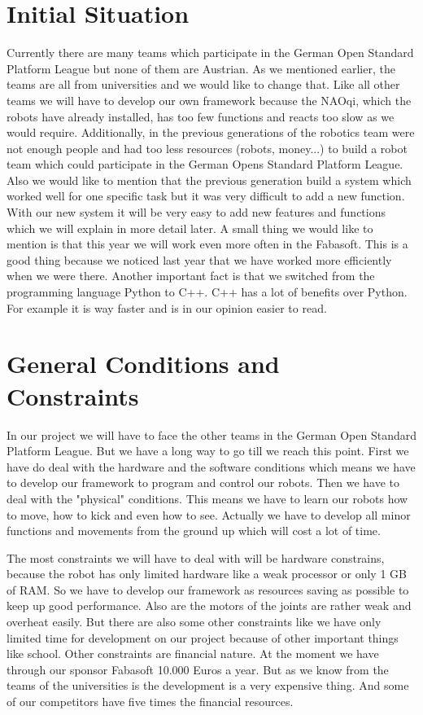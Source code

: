 \documentclass[12pt]{article}
\theoremstyle{definition}
\begin{document}
\pagebreak

\section{Initial Situation}


Currently there are many teams which participate in the German Open Standard Platform League but none of them are Austrian. As we mentioned earlier, the teams are all from universities and we would like to change that. Like all other teams we will have to develop our own framework because the NAOqi, which the robots have already installed, has too few functions and reacts too slow as we would require. Additionally, in the previous generations of the robotics team were not enough people and had too less resources (robots, money...) to build a robot team which could participate in the German Opens Standard Platform League. Also we would like to mention that the previous generation build a system which worked well for one specific task but it was very difficult to add a new function. With our new system it will be very easy to add new features and functions which we will explain in more detail later. A small thing we would like to mention is that this year we will work even more often in the Fabasoft. This is a good thing because we noticed last year that we have worked more efficiently when we were there. Another important fact is that we switched from the programming language Python to C++. C++ has a lot of benefits over Python. For example it is way faster and is in our opinion easier to read. 


\pagebreak

\section{General Conditions and Constraints}

In our project we will have to face the other teams in the German Open Standard Platform League. But we have a long way to go till we reach this point. First we have do deal with the hardware and the software conditions which means we have to develop our framework to program and control our robots. Then we have to deal with the "physical" conditions. This means we have to learn our robots how to move, how to kick and even how to see. Actually we have to develop all minor functions and movements from the ground up which will cost a lot of time.\linebreak

The most constraints we will have to deal with will be hardware constrains, because the robot has only limited hardware like a weak processor or only 1 GB of RAM. So we have to develop our framework as resources saving as possible to keep up good performance. Also are the motors of the joints are rather weak and overheat easily. But there are also some other constraints like we have only limited time for development on our project because of other important things like school. Other constraints are financial nature. At the moment we have through our sponsor Fabasoft 10.000 Euros a year. But as we know from the teams of the universities is the development is a very expensive thing. And some of our competitors have five times the financial resources.
\end{document}
